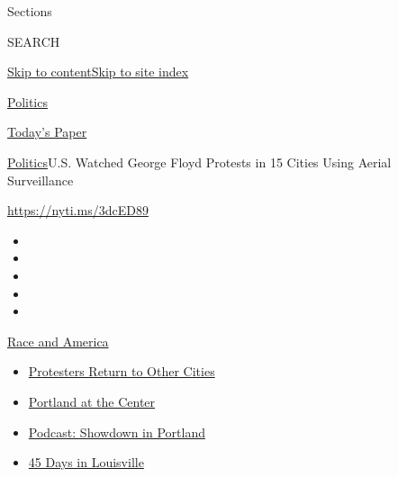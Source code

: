 Sections

SEARCH

\protect\hyperlink{site-content}{Skip to
content}\protect\hyperlink{site-index}{Skip to site index}

\href{https://www.nytimes.com/section/politics}{Politics}

\href{https://myaccount.nytimes.com/auth/login?response_type=cookie\&client_id=vi}{}

\href{https://www.nytimes.com/section/todayspaper}{Today's Paper}

\href{/section/politics}{Politics}\textbar{}U.S. Watched George Floyd
Protests in 15 Cities Using Aerial Surveillance

\url{https://nyti.ms/3dcED89}

\begin{itemize}
\item
\item
\item
\item
\item
\end{itemize}

\href{https://www.nytimes.com/news-event/george-floyd-protests-minneapolis-new-york-los-angeles?action=click\&pgtype=Article\&state=default\&region=TOP_BANNER\&context=storylines_menu}{Race
and America}

\begin{itemize}
\tightlist
\item
  \href{https://www.nytimes.com/2020/07/26/us/protests-portland-seattle-trump.html?action=click\&pgtype=Article\&state=default\&region=TOP_BANNER\&context=storylines_menu}{Protesters
  Return to Other Cities}
\item
  \href{https://www.nytimes.com/2020/07/24/us/portland-oregon-protests-white-race.html?action=click\&pgtype=Article\&state=default\&region=TOP_BANNER\&context=storylines_menu}{Portland
  at the Center}
\item
  \href{https://www.nytimes.com/2020/07/23/podcasts/the-daily/portland-protests.html?action=click\&pgtype=Article\&state=default\&region=TOP_BANNER\&context=storylines_menu}{Podcast:
  Showdown in Portland}
\item
  \href{https://www.nytimes.com/interactive/2020/07/16/us/black-lives-matter-protests-louisville-breonna-taylor.html?action=click\&pgtype=Article\&state=default\&region=TOP_BANNER\&context=storylines_menu}{45
  Days in Louisville}
\end{itemize}

